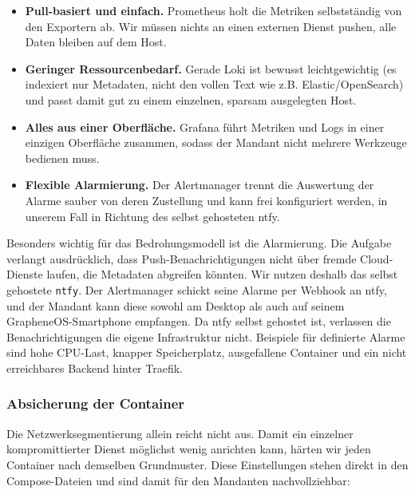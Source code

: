 \begin{itemize}
  \item \textbf{Pull-basiert und einfach.} Prometheus holt die Metriken
    selbstständig von den Exportern ab. Wir müssen nichts an einen externen
    Dienst pushen, alle Daten bleiben auf dem Host.
  \item \textbf{Geringer Ressourcenbedarf.} Gerade Loki ist bewusst
    leichtgewichtig (es indexiert nur Metadaten, nicht den vollen Text wie z.B. Elastic/OpenSearch) und passt damit gut zu einem einzelnen, sparsam ausgelegten Host.
  \item \textbf{Alles aus einer Oberfläche.} Grafana führt Metriken und Logs in
    einer einzigen Oberfläche zusammen, sodass der Mandant nicht mehrere
    Werkzeuge bedienen muss.
  \item \textbf{Flexible Alarmierung.} Der Alertmanager trennt die Auswertung
    der Alarme sauber von deren Zustellung und kann frei konfiguriert werden, in
    unserem Fall in Richtung des selbst gehosteten ntfy.
\end{itemize}

Besonders wichtig für das Bedrohungsmodell ist die Alarmierung. Die Aufgabe
verlangt ausdrücklich, dass Push-Benachrichtigungen nicht über fremde
Cloud-Dienste laufen, die Metadaten abgreifen könnten. Wir nutzen deshalb das
selbst gehostete \texttt{ntfy}. Der Alertmanager schickt seine Alarme per
Webhook an ntfy, und der Mandant kann diese sowohl am Desktop als auch auf
seinem GrapheneOS-Smartphone empfangen. Da ntfy selbst gehostet ist, verlassen
die Benachrichtigungen die eigene Infrastruktur nicht. Beispiele für
definierte Alarme sind hohe \ac{CPU}-Last, knapper Speicherplatz, ausgefallene
Container und ein nicht erreichbares Backend hinter Traefik.

\subsubsection{Absicherung der Container}
\label{sec:apphost-container}

Die Netzwerksegmentierung allein reicht nicht aus. Damit ein einzelner
kompromittierter Dienst möglichst wenig anrichten kann, härten wir jeden
Container nach demselben Grundmuster. Diese Einstellungen stehen direkt in den
Compose-Dateien und sind damit für den Mandanten nachvollziehbar:

